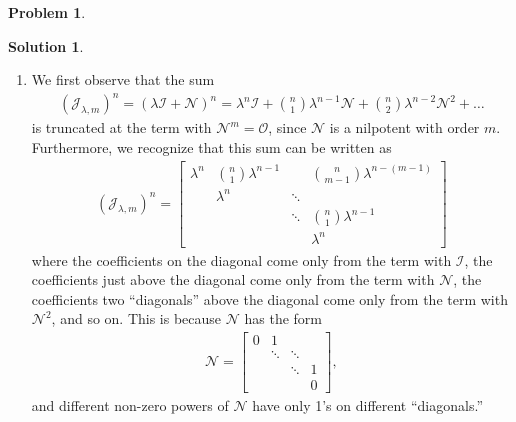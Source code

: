 \documentclass{article}
\theoremstyle{definition}
\newtheorem*{prob*}{Problem}
\newtheorem*{sln*}{Solution}
\newcommand{\N}{\mathcal{N}}
\newcommand{\jor}{\mathcal{J}}
\begin{document}
\begin{prob*}
\begin{sln*}
\begin{enumerate}
			
			\item  We first observe that the sum
			\begin{align*}
			\left(\jor_{\lambda,m}\right)^n = \left(\lambda\mathcal{I} + \mathcal{N}\right)^n = 
			\lambda^n \mathcal{I} + {n\choose 1}\lambda^{n-1}\mathcal{N} + {n\choose 2}\lambda^{n-2}\mathcal{N}^2 + \dots
			\end{align*}
			is truncated at the term  with $\N^m = \mathcal{O}$, since $\N$ is a nilpotent with order $m$. Furthermore, we recognize that this sum can be written as
			\begin{align*}
			\left(\jor_{\lambda,m}\right)^n = \begin{bmatrix}
			\lambda^n & {n\choose 1}\lambda^{n-1} &  & {n\choose m-1}\lambda^{n-(m-1)}\\
					  &	\lambda^n		& 		\ddots	&	 \\
					  &					&	\ddots			& 	{n\choose 1}\lambda^{n-1}	\\
					  &					&				&	\lambda^n
			\end{bmatrix}
			\end{align*}
			where the coefficients on the diagonal come only from the term with $\mathcal{I}$, the coefficients just above the diagonal come only from the term with $\N$, the coefficients two ``diagonals'' above the diagonal come only from the term with $\N^2$, and so on. This is because $\N$ has the form
			\begin{align*}
			\N = \begin{bmatrix}
			0& 1 & & \\
			&\ddots & \ddots&\\
			& & \ddots &1 \\
			& & & 0
			\end{bmatrix},
			\end{align*}
			and different non-zero powers of $\N$ have only 1's on different ``diagonals.''\\
			

\end{enumerate}
\end{sln*}
\end{prob*}
\end{document}
